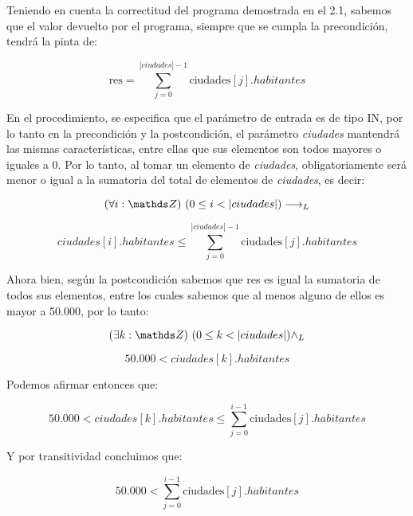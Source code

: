 \documentclass[10pt,a4paper]{article}
\begin{document}
Teniendo en cuenta la correctitud del programa demostrada en el 2.1, sabemos que el valor devuelto por el programa, siempre que se cumpla la precondición, tendrá la pinta de:


\[
\text{res} = \sum_{j=0}^{|ciudades|-1} \text{ciudades}[j].habitantes 
\]

En el procedimiento, se especifica que el parámetro de entrada es de tipo IN, por lo tanto en la precondición y la postcondición, el parámetro \textit{ciudades} mantendrá las mismas características, entre ellas que sus elementos son todos mayores o iguales a 0. Por lo tanto, al tomar un elemento de \textit{ciudades}, obligatoriamente será menor o igual a la sumatoria del total de elementos de \textit{ciudades}, es decir:

\[
	\paraTodo[unalinea]{i}{\ent}{0 \leq i < |ciudades|} \implicaLuego
\]

\[
\textit{ciudades}[i].habitantes \leq \sum_{j=0}^{|ciudades|-1} \text{ciudades}[j].habitantes 
\]

Ahora bien, según la postcondición sabemos que res es igual la sumatoria de todos sus elementos, entre los cuales sabemos que al menos alguno de ellos es mayor a 50.000, por lo tanto:

\[
\existe[unalinea]{k}{\ent}{0 \leq k < |ciudades|} \yLuego
\]

\[
50.000 < \textit{ciudades}[k].habitantes  
\]

Podemos afirmar entonces que:

\[
50.000 < \textit{ciudades}[k].habitantes \leq \sum_{j=0}^{i-1} \text{ciudades}[j].habitantes 
\]

Y por transitividad concluimos que:

\[
50.000 < \sum_{j=0}^{i-1} \text{ciudades}[j].habitantes
\]
\end{document}
